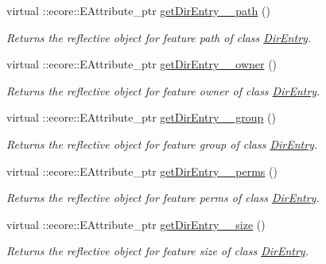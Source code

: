 \begin{DoxyCompactItemize}
virtual ::ecore::EAttribute\_\-ptr \hyperlink{classFMS__Data_1_1FMS__DataPackage_ab5a12a5320ca51222d9a66ce1a9a7efc}{getDirEntry\_\-\_\-path} ()
\begin{DoxyCompactList}\small\item\em Returns the reflective object for feature path of class \hyperlink{classFMS__Data_1_1DirEntry}{DirEntry}. \item\end{DoxyCompactList}\item 
virtual ::ecore::EAttribute\_\-ptr \hyperlink{classFMS__Data_1_1FMS__DataPackage_ae5944141064088fd152b1f533897722d}{getDirEntry\_\-\_\-owner} ()
\begin{DoxyCompactList}\small\item\em Returns the reflective object for feature owner of class \hyperlink{classFMS__Data_1_1DirEntry}{DirEntry}. \item\end{DoxyCompactList}\item 
virtual ::ecore::EAttribute\_\-ptr \hyperlink{classFMS__Data_1_1FMS__DataPackage_a9a4d42b43b5eae7481ab4868e2874548}{getDirEntry\_\-\_\-group} ()
\begin{DoxyCompactList}\small\item\em Returns the reflective object for feature group of class \hyperlink{classFMS__Data_1_1DirEntry}{DirEntry}. \item\end{DoxyCompactList}\item 
virtual ::ecore::EAttribute\_\-ptr \hyperlink{classFMS__Data_1_1FMS__DataPackage_a51c35128bda3d14c59ae61ac3203d6cb}{getDirEntry\_\-\_\-perms} ()
\begin{DoxyCompactList}\small\item\em Returns the reflective object for feature perms of class \hyperlink{classFMS__Data_1_1DirEntry}{DirEntry}. \item\end{DoxyCompactList}\item 
virtual ::ecore::EAttribute\_\-ptr \hyperlink{classFMS__Data_1_1FMS__DataPackage_ab4f5eea64e3a1fce1c06a3cf294b9c94}{getDirEntry\_\-\_\-size} ()
\begin{DoxyCompactList}\small\item\em Returns the reflective object for feature size of class \hyperlink{classFMS__Data_1_1DirEntry}{DirEntry}. \item\end{DoxyCompactList}\item 

\end{DoxyCompactItemize}
